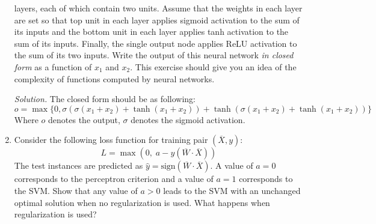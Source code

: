 \documentclass[12pt]{article}
\newcommand\sol[1] {
    \begin{mdframed}
        \emph{Solution.} #1
    \end{mdframed}
}
\begin{document}
\begin{enumerate}[ref=\theenumi]
        layers, each of which contain two units. Assume that the weights in each 
        layer are set so that top unit in each layer applies sigmoid activation 
        to the sum of its inputs and the bottom unit in each layer applies tanh 
        activation to the sum of its inputs. Finally, the single output node 
        applies ReLU activation to the sum of its two inputs. Write the output 
        of this neural network \emph{in closed form} as a function of $x_1$ and 
        $x_2$. This exercise should give you an idea of the complexity of 
        functions computed by neural networks.
        \sol {
            The closed form should be as following:
            \[
                o = \max{\{0, \sigma(\sigma(x_1 + x_2) + \tanh(x_1 + x_2)) + \tanh(\sigma(x_1 + x_2) + \tanh(x_1 + x_2))\}}
            \]
            Where $o$ denotes the output, $\sigma$ denotes the sigmoid activation.
        }
  
    \item Consider the following loss function for training pair $(\overline{X}, y)$:
        \[
            L = \max{(0,\;a - y(\overline{W} \cdot \overline{X}))}
        \]
        The test instances are predicted as 
        $\hat{y} = \text{sign}( \overline{W} \cdot \overline{X} )$. 
        A value of $a = 0$ corresponds to the perceptron criterion and a value 
        of $a = 1$ corresponds to the SVM. Show that any value of $a > 0$ leads 
        to the SVM with an unchanged optimal solution when no regularization is 
        used. What happens when regularization is used? \label{e1}
        

\end{enumerate}
\end{document}
